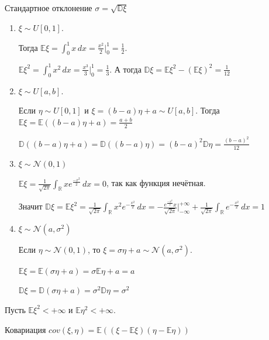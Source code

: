 \begin{definition}
    Стандартное отклонение $\sigma = \sqrt{\mathbb{D} \xi}$
\end{definition}

\begin{example}
    \begin{enumerate}
        \item {
            $\xi \sim U[0, 1]$. 
            
            Тогда $\mathbb{E} \xi = \int_{0}^{1} x \, dx = \frac{x^2}{2} \bigg |_0^1 = \frac{1}{2}$.

            $\mathbb{E} \xi^2 = \int_{0}^{1} x^2 \, dx = \frac{x^3}{3} \bigg |_0^1 = \frac{1}{3}$. А тогда
            $\mathbb{D} \xi = \mathbb{E} \xi^2 - (\mathbb{E} \xi)^2 = \frac{1}{12}$
        }
        \item {
            $\xi \sim U[a, b]$. 
            
            Если $\eta \sim U[0, 1]$ и $\xi = (b - a)\eta + a \sim U[a, b]$.
            Тогда $\mathbb{E} \xi = \mathbb{E} ((b - a) \eta  + a) = \frac{a + b}{2}$

            $\mathbb{D} ((b-a)\eta + a) = \mathbb{D} ((b - a)\eta) = (b-a)^2\mathbb{D}\eta = \frac{(b-a)^2}{12}$
        }
        \item {
            $\xi \sim \mathcal{N} (0, 1)$

            $\mathbb{E} \xi = \frac{1}{\sqrt{2\pi}} \int_{\mathbb{R}} xe^{\frac{-x^2}{2}} \, dx = 0$, так как функция нечётная.

            Значит $\mathbb{D} \xi = \mathbb{E} \xi ^2 = \frac{1}{\sqrt{2\pi}} \int_{\mathbb{R}} x^2 e^{-\frac{x^2}{2}} \, dx = 
            -\frac{e^{\frac{-x^2}{2}}x}{\sqrt{2\pi}} \bigg |_{-\infty}^{+\infty} + \frac{1}{\sqrt{2\pi}} \int_{\mathbb{R}} e^{-\frac{x^2}{2}} \, dx = 1$ 
        }
        \item {
            $\xi \sim \mathcal{N}(a, \sigma^2)$

            Если $\eta \sim \mathcal{N}(0, 1)$, то $\xi = \sigma \eta + a \sim \mathcal{N}(a, \sigma^2)$.
            
            $\mathbb{E} \xi = \mathbb{E} (\sigma \eta + a) = \sigma \mathbb{E} \eta + a = a$

            $\mathbb{D} \xi = \mathbb{D} (\sigma \eta + a) = \sigma^2 \mathbb{D} \eta = \sigma^2$
        }
    \end{enumerate}
\end{example}

\begin{definition}
    Пусть $\mathbb{E} \xi^2 < +\infty$ и $\mathbb{E} \eta^2 < +\infty$.

    Ковариация $cov (\xi, \eta) = \mathbb{E} ((\xi - \mathbb{E}\xi)(\eta - \mathbb{E}\eta))$
\end{definition}

